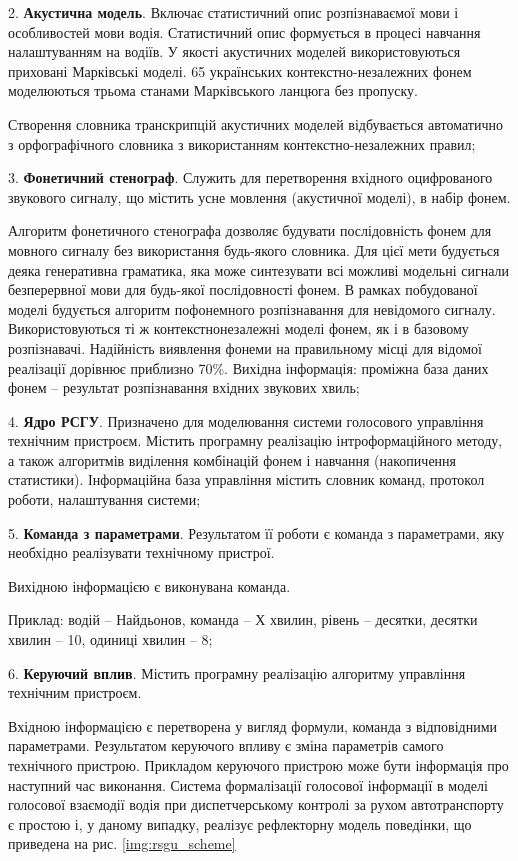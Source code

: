 2. \textbf{Акустична модель}. Включає статистичний опис розпізнаваємої мови і особливостей мови водія. Статистичний опис формується в процесі навчання налаштуванням на водіїв. У якості акустичних моделей використовуються приховані Марківські моделі. 65 українських контекстно-незалежних фонем моделюються трьома станами Марківського ланцюга без пропуску.

Створення словника транскрипцій акустичних моделей відбувається автоматично з орфографічного словника з використанням контекстно-незалежних правил;

3. \textbf{Фонетичний стенограф}. Служить для перетворення вхідного оцифрованого звукового сигналу, що містить усне мовлення (акустичної моделі), в набір фонем.

Алгоритм фонетичного стенографа дозволяє будувати послідовність фонем для мовного сигналу без використання будь-якого словника. Для цієї мети будується деяка генеративна граматика, яка може синтезувати всі можливі модельні сигнали безперервної мови для будь-якої послідовності фонем. В рамках побудованої моделі будується алгоритм пофонемного розпізнавання для невідомого сигналу. Використовуються ті ж контекстнонезалежні моделі фонем, як і в базовому розпізнавачі. Надійність виявлення фонеми на правильному місці для відомої реалізації дорівнює приблизно 70\%. Вихідна інформація: проміжна база даних фонем – результат розпізнавання вхідних звукових хвиль;

4. \textbf{Ядро РСГУ}. Призначено для моделювання системи голосового управління технічним пристроєм. Містить програмну реалізацію інтроформаційного методу, а також алгоритмів виділення комбінацій фонем і навчання (накопичення статистики). Інформаційна база управління містить словник команд, протокол роботи, налаштування системи;

5. \textbf{Команда з параметрами}. Результатом її роботи є команда з параметрами, яку необхідно реалізувати технічному пристрої.

Вихідною інформацією є виконувана команда.

Приклад: водій – Найдьонов, команда – Х хвилин, рівень – десятки, десятки хвилин – 10, одиниці хвилин – 8;

6. \textbf{Керуючий вплив}. Містить програмну реалізацію алгоритму управління технічним пристроєм.

Вхідною інформацією є перетворена у вигляд формули, команда з відповідними параметрами. Результатом керуючого впливу є зміна параметрів самого технічного пристрою. Прикладом керуючого пристрою може бути інформація про наступний час виконання. Система формалізації голосової інформації в моделі голосової взаємодії водія при диспетчерському контролі за рухом автотранспорту є простою і, у даному випадку, реалізує рефлекторну модель поведінки, що приведена на рис. \ref{img:rsgu_scheme}

